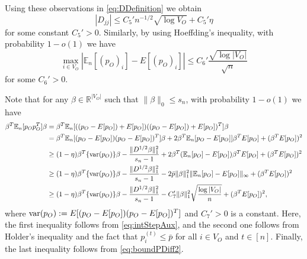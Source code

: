 \documentclass[opre,nonblindrev]{informs3} %
\def\En{{\mathbb{E}_n}}
\begin{document}
\begin{APPENDIX}{}
\begin{equation}
\end{equation}
Using these observations in \eqref{eq:DDefinition} we obtain
\begin{equation}\label{eq:dBound}
|D_{jj}|\leq C_5'n^{-1/2}\sqrt{\log V_O} + C_5'\eta
\end{equation}
for some constant $C_5'> 0$.
Similarly, by using  Hoeffding's inequality, 
with probability $1-o(1)$ we have
\begin{equation} \label{eq:boundPDiff2}
\max_{i \in {V}_O}
\left| \En[  (p_O)_i ]-
E[ ( p_O)_i ]  \right|
\leq
C_6'
\frac{\sqrt{\log |V_O|}}{\sqrt{n}}
\end{equation}
for some $C_6'>0$.



Note that for any $\beta \in \mathbb{R}^{|V_O|}$
such that $\|\beta\|_0\leq s_n$,
with probability $1-o(1)$
we have
\begin{equation} \label{eq:firstBoundPo}
\begin{aligned}
\beta^T\En[p_Op_O^T]\beta & = \beta^T
\En[((p_O-E[p_O]) +E[p_O]) ((p_O-E[p_O]) +E[p_O])^T] \beta\\
& = \beta^T\En[(p_O-E[p_O])(p_O-E[p_O])^T]\beta+2\beta^T\En[p_O-E[p_O]]\beta^TE[p_O]+(\beta^TE[p_O])^2\\
& \geq (1-\eta)\beta^T\{{\rm var}(p_O)\}\beta - \frac{\|D^{1/2}\beta\|_1^2}{s_n-1} + 2\beta^T(\En[p_O]-E[p_O])\beta^TE[p_O]+(\beta^TE[p_O])^2\\
& \geq (1-\eta)\beta^T\{{\rm var}(p_O)\}\beta - \frac{\|D^{1/2}\beta\|_1^2}{s_n-1} -2 \bar{p} \|\beta\|_1^2\|\En[p_O]-E[p_O]\|_\infty +(\beta^TE[p_O])^2\\
& \geq (1-\eta)\beta^T\{{\rm var}(p_O)\}\beta - \frac{\|D^{1/2}\beta\|_1^2}{s_n-1}-C'_7\|\beta\|_1^2
\sqrt{\frac{\log |V_O|}{n}}
+(\beta^TE[p_O])^2,
\end{aligned}
\end{equation}
where
${\rm var}  (p_O):= E[(p_O-E[p_O])(p_O-E[p_O])^T]$
and $C_7'>0$ is a constant. Here,
the first inequality follows from \eqref{eq:intStepAux}, and
the second one follows from Holder's inequality and the fact that $p_i^{(t)} \leq\bar{p}$ for all $i\in V_O$ and $t\in [n]$.
Finally, the
last inequality follows from \eqref{eq:boundPDiff2}.



\end{APPENDIX}
\end{document}
